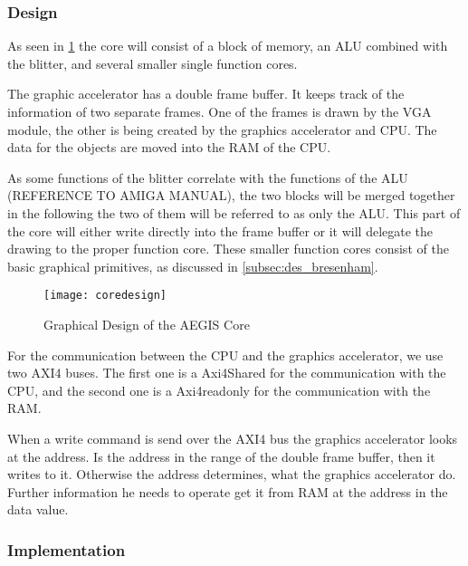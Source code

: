 \subsubsection*{Design}
As seen in \cref{img:coredes} the core will consist of a block of memory, an ALU combined with the blitter, and several smaller single function cores.

The graphic accelerator has a double frame buffer. It keeps track of the information of two separate frames. One of the frames is drawn by the VGA module, the other is being created by the graphics accelerator and CPU. The data for the objects are moved into the RAM of the CPU.

As some functions of the blitter correlate with the functions of the ALU (REFERENCE TO AMIGA MANUAL), the two blocks will be merged together in the following the two of them will be referred to as only the ALU. This part of the core will either write directly into the frame buffer or it will delegate the drawing to the proper function core. These smaller function cores consist of the basic graphical primitives, as discussed in \cref{subsec:des_bresenham}.
\begin{figure}[H]
	\centering
	\texttt{[image: coredesign]}
	\caption{Graphical Design of the AEGIS Core }
	\label{img:coredes}
\end{figure}

For the communication between the CPU and the graphics accelerator, we use two AXI4 buses. The first one is a Axi4Shared for the communication with the CPU, and the second one is a Axi4readonly for the communication with the RAM.

When a write command is send over the AXI4 bus the graphics accelerator looks at the address. Is the address in the range of the double frame buffer, then it writes to it. Otherwise the address determines, what the graphics accelerator do. Further information he needs to operate get it from RAM at the address in the data value. 

\subsubsection*{Implementation}